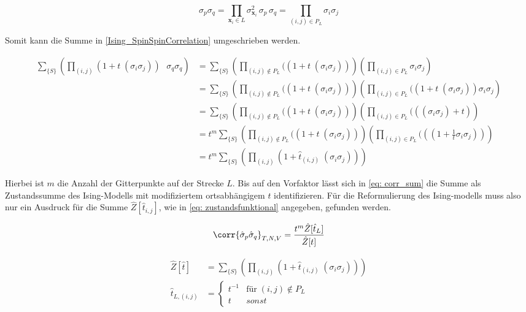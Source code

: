 $$ \sigma_{p} \sigma_{q} = \prod_{\bm{x}_i \in L} \sigma_{\bm{x}_i}^{2} \,\sigma_{p}\,\sigma_{q} = \prod_{(i,j) \in P_L} \sigma_{i}\sigma_{j} $$

\noindent Somit kann die Summe in \eqref{Ising_SpinSpinCorrelation} umgeschrieben werden. 

\begin{align} 
 \sum_{\{S\}} \left(\prod_{(i,j)} (1 +  t \; (\sigma_i \sigma_j))\textbf{ }\sigma_{q} \sigma_{q}\right) 
  & = \sum_{\{S\}} \left(\prod_{(i,j) \notin P_L } ((1 +  t \; (\sigma_i \sigma_j))\right) \left(\prod_{(i,j) \in P_L} \sigma_i \sigma_j\right) \\
  & = \sum_{\{S\}} \left(\prod_{(i,j) \notin P_L} ((1 +  t \; (\sigma_i \sigma_j))\right) \left(\prod_{(i,j) \in P_L} ((1 +  t \; (\sigma_i \sigma_j))\sigma_i \sigma_j \right) \\
  & = \sum_{\{S\}} \left(\prod_{(i,j) \notin P_L} ((1 +  t \; (\sigma_i \sigma_j))\right) \left(\prod_{(i,j) \in P_L} (((\sigma_i \sigma_j) +  t)\right)  \\
  & = t^m \sum_{\{S\}} \left(\prod_{(i,j) \notin P_L} ((1 +  t \; (\sigma_i \sigma_j))\right) \left(\prod_{(i,j) \in P_L} (((1 + \frac{1}{t}\sigma_i \sigma_j))\right)\\
  &= t^m \sum_{\{S\}} \left(\prod_{(i,j)} (1 + \hat{t}_{(i,j)} \; (\sigma_i \sigma_j)) \right) \label{eq: corr_sum}
\end{align}

\noindent Hierbei ist $m$ die Anzahl der Gitterpunkte auf der Strecke $L$. Bis auf den Vorfaktor lässt sich in \eqref{eq: corr_sum} die Summe als Zustandssumme des Ising-Modells mit modifiziertem ortsabhängigem $t$ identifizieren. Für die Reformulierung des Ising-modells muss also nur ein Ausdruck für die Summe $\hat{Z}[\hat{t}_{i,j}]$, wie in \eqref{eq: zustandsfunktional} angegeben, gefunden werden.  

\begin{grayframe}[frametitle = {Spin Korrelation als Zustandsumme auf defektem Gitter}]
\begin{equation}
\corr{\hat{\sigma}_{p} \hat{\sigma}_{q} }_{T,N,V} = \frac{t^m \hat{Z}[\hat{t}_L]}{\hat{Z}[t]}
\end{equation}

\begin{align}
\hat{Z}[\hat{t}] &=\sum_{\{S\}} \left(\prod_{(i,j)} (1 + \hat{t}_{(i,j)} \; (\sigma_i \sigma_j)) \right) \label{eq: zustandsfunktional}\\
\hat{t}_{L,(i,j)} &= \left\{\begin{array}{ll} t^{-1} & \text{für}\; (i,j)\notin P_L \\
          t & sonst \end{array} \right.
\end{align}

\end{grayframe}

